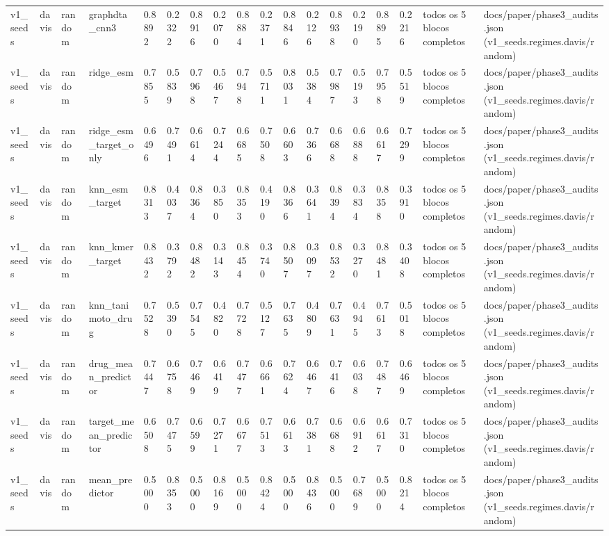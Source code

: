 \begin{table}[htbp]
\begin{tabular}{llllllllllllllllll}
v1\_seeds & davis & random & graphdta\_cnn3 & 0.8892 & 0.2322 & 0.8916 & 0.2070 & 0.8884 & 0.2371 & 0.8846 & 0.2126 & 0.8938 & 0.2190 & 0.8895 & 0.2216 & todos os 5 blocos completos & docs/paper/phase3\_audits.json (v1\_seeds.regimes.davis/random) \\
v1\_seeds & davis & random & ridge\_esm & 0.7855 & 0.5839 & 0.7968 & 0.5467 & 0.7948 & 0.5711 & 0.8031 & 0.5384 & 0.7987 & 0.5193 & 0.7958 & 0.5519 & todos os 5 blocos completos & docs/paper/phase3\_audits.json (v1\_seeds.regimes.davis/random) \\
v1\_seeds & davis & random & ridge\_esm\_target\_only & 0.6496 & 0.7491 & 0.6614 & 0.7244 & 0.6685 & 0.7508 & 0.6603 & 0.7366 & 0.6688 & 0.6888 & 0.6617 & 0.7299 & todos os 5 blocos completos & docs/paper/phase3\_audits.json (v1\_seeds.regimes.davis/random) \\
v1\_seeds & davis & random & knn\_esm\_target & 0.8313 & 0.4037 & 0.8364 & 0.3850 & 0.8353 & 0.4190 & 0.8366 & 0.3641 & 0.8394 & 0.3834 & 0.8358 & 0.3910 & todos os 5 blocos completos & docs/paper/phase3\_audits.json (v1\_seeds.regimes.davis/random) \\
v1\_seeds & davis & random & knn\_kmer\_target & 0.8432 & 0.3792 & 0.8482 & 0.3143 & 0.8454 & 0.3740 & 0.8507 & 0.3097 & 0.8532 & 0.3270 & 0.8481 & 0.3408 & todos os 5 blocos completos & docs/paper/phase3\_audits.json (v1\_seeds.regimes.davis/random) \\
v1\_seeds & davis & random & knn\_tanimoto\_drug & 0.7528 & 0.5390 & 0.7545 & 0.4820 & 0.7728 & 0.5127 & 0.7635 & 0.4809 & 0.7631 & 0.4945 & 0.7613 & 0.5018 & todos os 5 blocos completos & docs/paper/phase3\_audits.json (v1\_seeds.regimes.davis/random) \\
v1\_seeds & davis & random & drug\_mean\_predictor & 0.7447 & 0.6758 & 0.7469 & 0.6419 & 0.7477 & 0.6661 & 0.7624 & 0.6467 & 0.7416 & 0.6038 & 0.7487 & 0.6469 & todos os 5 blocos completos & docs/paper/phase3\_audits.json (v1\_seeds.regimes.davis/random) \\
v1\_seeds & davis & random & target\_mean\_predictor & 0.6508 & 0.7475 & 0.6599 & 0.7271 & 0.6677 & 0.7513 & 0.6613 & 0.7381 & 0.6688 & 0.6912 & 0.6617 & 0.7310 & todos os 5 blocos completos & docs/paper/phase3\_audits.json (v1\_seeds.regimes.davis/random) \\
v1\_seeds & davis & random & mean\_predictor & 0.5000 & 0.8353 & 0.5000 & 0.8169 & 0.5000 & 0.8424 & 0.5000 & 0.8436 & 0.5000 & 0.7689 & 0.5000 & 0.8214 & todos os 5 blocos completos & docs/paper/phase3\_audits.json (v1\_seeds.regimes.davis/random) \\

\end{tabular}
\end{table}
